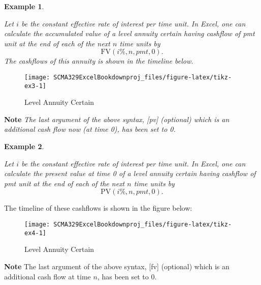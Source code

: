 \documentclass[
]{article}
\theoremstyle{definition}
\theoremstyle{definition}
\newtheorem{example}{Example}[section]
\theoremstyle{definition}
\theoremstyle{definition}
\theoremstyle{remark}
\begin{document}
\begin{example}
\protect\hypertarget{exm:unlabeled-div-5}{}\label{exm:unlabeled-div-5}

\emph{Let \(i\) be the constant effective rate of interest per
time unit. In Excel, one can calculate the accumulated value of a level
annuity certain having cashflow of pmt unit at the end of each of the
next \(n\) time units by \[\text{FV}(i\%, n, pmt, 0).\] The cashflows of
this annuity is shown in the timeline below.}

\begin{figure}

{\centering \texttt{[image: SCMA329ExcelBookdownproj\_files/figure-latex/tikz-ex3-1]} 

}

\caption{Level Annuity Certain}\label{fig:tikz-ex3}
\end{figure}

\textbf{Note}
\emph{The last argument of the above syntax, {[}pv{]} (optional) which is an
additional cash flow now (at time 0), has been set to 0.}

\end{example}

\begin{example}
\protect\hypertarget{exm:unlabeled-div-6}{}\label{exm:unlabeled-div-6}

\emph{Let \(i\) be the constant effective rate of interest per
time unit. In Excel, one can calculate the present value at time 0 of a
level annuity certain having cashflow of pmt unit at the end of each of
the next \(n\) time units by \[\text{PV}(i\%, n, pmt, 0).\]}

\end{example}

The timeline of these cashflows is shown in the figure below:

\begin{figure}

{\centering \texttt{[image: SCMA329ExcelBookdownproj\_files/figure-latex/tikz-ex4-1]} 

}

\caption{Level Annuity Certain}\label{fig:tikz-ex4}
\end{figure}

\textbf{Note}
The last argument of the above syntax, {[}fv{]} (optional) which is an
additional cash flow at time \(n\), has been set to 0.
\end{document}
